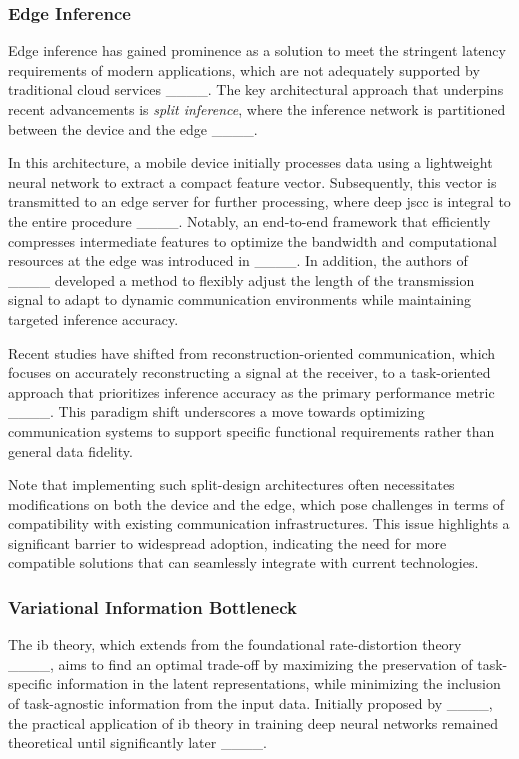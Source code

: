 \subsubsection{Edge Inference}
Edge inference has gained prominence as a solution to meet the stringent latency requirements of modern applications, which are not adequately supported by traditional cloud services ____. The key architectural approach that underpins recent advancements is \textit{split inference}, where the inference network is partitioned between the device and the edge ____.

In this architecture, a mobile device initially processes data using a lightweight neural network to extract a compact feature vector. Subsequently, this vector is transmitted to an edge server for further processing, where deep \gls{jscc} is integral to the entire procedure ____. Notably, an end-to-end framework that efficiently compresses intermediate features to optimize the bandwidth and computational resources at the edge was introduced in ____. In addition, the authors of ____ developed a method to flexibly adjust the length of the transmission signal to adapt to dynamic communication environments while maintaining targeted inference accuracy.

Recent studies have shifted from reconstruction-oriented communication, which focuses on accurately reconstructing a signal at the receiver, to a task-oriented approach that prioritizes inference accuracy as the primary performance metric ____. This paradigm shift underscores a move towards optimizing communication systems to support specific functional requirements rather than general data fidelity.

Note that implementing such split-design architectures often necessitates modifications on both the device and the edge, which pose challenges in terms of compatibility with existing communication infrastructures. This issue highlights a significant barrier to widespread adoption, indicating the need for more compatible solutions that can seamlessly integrate with current technologies.


\subsubsection{Variational Information Bottleneck}
The \gls{ib} theory, which extends from the foundational rate-distortion theory ____, aims to find an optimal trade-off by maximizing the preservation of task-specific information in the latent representations, while minimizing the inclusion of task-agnostic information from the input data. Initially proposed by ____, the practical application of \gls{ib} theory in training deep neural networks remained theoretical until significantly later ____.

